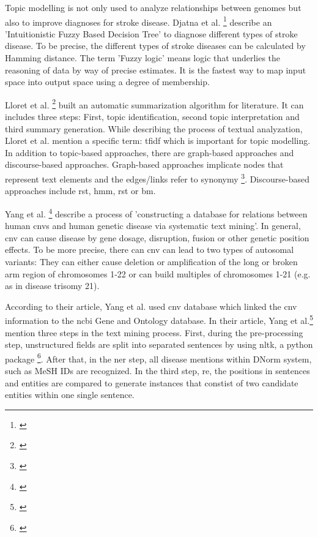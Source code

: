{Topic modelling is not only used to analyze relationships between genomes but also to improve diagnoses for stroke disease. Djatna et al. \footnote{\autocite{djatna_2018}} describe an 'Intuitionistic Fuzzy Based Decision Tree' to diagnose different types of stroke disease. To be precise, the different types of stroke diseases can be calculated by Hamming distance. The term 'Fuzzy logic' means logic that underlies the reasoning of data by way of precise estimates. It is the fastest way to map input space into output space using a degree of membership.

Lloret et al. \footnote{\autocite{lloret_2012}} built an automatic summarization algorithm for literature. It can includes three steps: First, topic identification, second topic interpretation and third summary generation. While describing the process of textual analyzation, Lloret et al. mention a specific term: \gls{tfidf} which is important for topic modelling. In addition to topic-based approaches, there are graph-based approaches and discourse-based approaches. Graph-based approaches implicate nodes that represent text elements and the edges/links refer to synonymy \footnote{\autocite{lloret_2012}}. Discourse-based approaches include \gls{rst}, \gls{hmm}, \gls{rst} or \gls{bm}. 

Yang et al. \footnote{\autocite{yang_2018}} describe a process of 'constructing a database for relations between human \gls{cnv}s and human genetic disease via systematic text mining'. In general, \gls{cnv} can cause disease by gene dosage, disruption, fusion or other genetic position effects. 
To be more precise, there can \gls{cnv} can lead to two types of autosomal variants: They can either cause deletion or amplification of the long or broken arm region of chromosomes 1-22 or can build multiples of chromosomes 1-21 (e.g. as in disease trisomy 21). 

According to their article, Yang et al. used \gls{cnv} database which linked the \gls{cnv} information to the \gls{ncbi} Gene and Ontology database. In their article, Yang et al.\footnote{\autocite{yang_2018}} mention three steps in the text mining process. First, during the pre-processing step, unstructured fields are split into separated sentences by using \gls{nltk}, a python package \footnote{\autocite{nltk}}. After that, in the \gls{ner} step, all disease mentions within DNorm system, such as MeSH IDs are recognized. In the third step, \gls{re}, the positions in sentences and entities are compared to generate instances that constist of two candidate entities within one single sentence.

}
